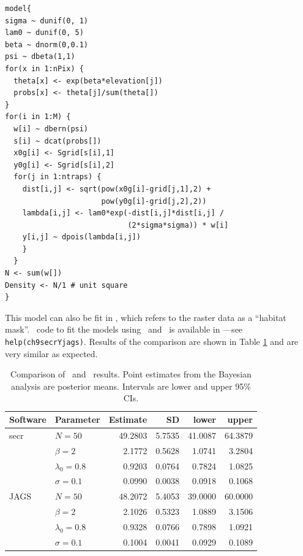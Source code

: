 \begin{small}
\begin{verbatim}
model{
sigma ~ dunif(0, 1)
lam0 ~ dunif(0, 5)
beta ~ dnorm(0,0.1)
psi ~ dbeta(1,1)
for(x in 1:nPix) {
  theta[x] <- exp(beta*elevation[j])
  probs[x] <- theta[j]/sum(theta[])
}
for(i in 1:M) {
  w[i] ~ dbern(psi)
  s[i] ~ dcat(probs[])
  x0g[i] <- Sgrid[s[i],1]
  y0g[i] <- Sgrid[s[i],2]
  for(j in 1:ntraps) {
    dist[i,j] <- sqrt(pow(x0g[i]-grid[j,1],2) +
                      pow(y0g[i]-grid[j,2],2))
    lambda[i,j] <- lam0*exp(-dist[i,j]*dist[i,j] /
                            (2*sigma*sigma)) * w[i]
    y[i,j] ~ dpois(lambda[i,j])
    }
  }
N <- sum(w[])
Density <- N/1 # unit square
}
\end{verbatim}
\end{small}

This model can also be fit in \secr, which refers
to the raster data as a ``habitat mask''. \R~code to
fit the models using \secr~and \jags~is available in \scrbook---see
\verb#help(ch9secrYjags)#. Results of the
comparison are shown in Table \ref{ch9:tab:secrYjags} and are
very similar as expected.

\begin{table}[h!]
\centering
\caption{Comparison of \secr~and \jags~results. Point estimates from
  the Bayesian analysis are posterior means. Intervals are lower and
  upper 95\% CIs.}
\begin{tabular}{llrrrr}
\hline
Software & Parameter & Estimate & SD & lower & upper \\
\hline
 secr & $N=50$ & 49.2803 & 5.7535 & 41.0087 & 64.3879 \\
      & $\beta=2$ &  2.1772 & 0.5628 &  1.0741 &  3.2804 \\
      & $\lambda_0=0.8$ &  0.9203 & 0.0764 &  0.7824 &  1.0825 \\
      & $\sigma=0.1$ &  0.0990 & 0.0038 &  0.0918 &  0.1068 \\
\hline
 JAGS & $N=50$ & 48.2072 & 5.4053 & 39.0000 & 60.0000 \\
      & $\beta=2$ &  2.1026 & 0.5323 &  1.0889 &  3.1506 \\
      & $\lambda_0=0.8$ &  0.9328 & 0.0766 &  0.7898 &  1.0921 \\
      & $\sigma=0.1$ &  0.1004 & 0.0041 &  0.0929 &  0.1089 \\
\hline
\end{tabular}
\label{ch9:tab:secrYjags}
\end{table}


